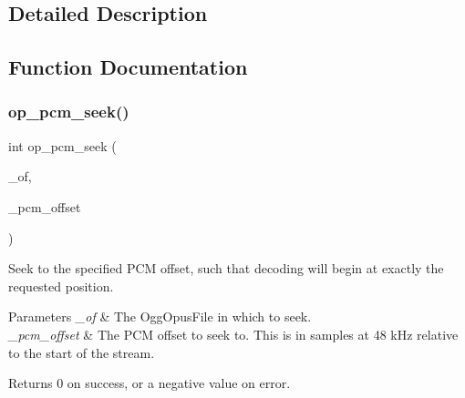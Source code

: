 \subsection{Detailed Description}


\subsection{Function Documentation}
\mbox{\label{group__stream__seeking_gad4f20d0601c2bab8d724f647673ae92c}} 
\subsubsection{\texorpdfstring{op\_pcm\_seek()}{op\_pcm\_seek()}}
{\footnotesize\ttfamily int op\+\_\+pcm\+\_\+seek (\begin{DoxyParamCaption}\item[{Ogg\+Opus\+File $\ast$}]{\+\_\+of,  }\item[{ogg\+\_\+int64\+\_\+t}]{\+\_\+pcm\+\_\+offset }\end{DoxyParamCaption})}

Seek to the specified P\+CM offset, such that decoding will begin at exactly the requested position. 
\begin{DoxyParams}{Parameters}
{\em \+\_\+of} & The {\ttfamily Ogg\+Opus\+File} in which to seek. \\
\hline
{\em \+\_\+pcm\+\_\+offset} & The P\+CM offset to seek to. This is in samples at 48 k\+Hz relative to the start of the stream. \\
\hline
\end{DoxyParams}
\begin{DoxyReturn}{Returns}
0 on success, or a negative value on error. 
\end{DoxyReturn}

